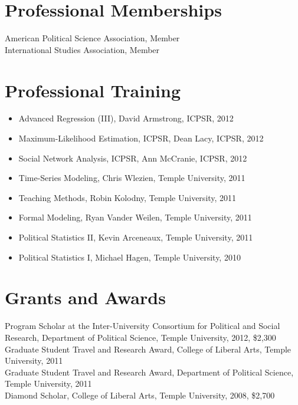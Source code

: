 \documentclass[margin, 12pt]{res} %
\begin{document}
\begin{resume}
\section{Professional Memberships} 

American Political Science Association, Member \vspace{3 mm} \\
International Studies Association, Member
 
\section{Professional Training}
\begin{itemize}
\item Advanced Regression (III), David Armstrong, ICPSR, 2012
\item Maximum-Likelihood Estimation, ICPSR, Dean Lacy, ICPSR, 2012
\item Social Network Analysis, ICPSR, Ann McCranie, ICPSR, 2012
\item Time-Series Modeling, Chris Wlezien, Temple University, 2011
\item Teaching Methods, Robin Kolodny, Temple University, 2011
\item Formal Modeling, Ryan Vander Weilen, Temple University, 2011
\item Political Statistics II, Kevin Arceneaux, Temple University, 2011
\item Political Statistics I, Michael Hagen, Temple University, 2010
\end{itemize}


\section{Grants and Awards} 

Program Scholar at the Inter-University Consortium for Political and Social Research, Department of Political Science, Temple University, 2012, \$2,300 \vspace{3 mm} \\
Graduate Student Travel and Research Award, College of Liberal Arts, Temple University, 2011 \vspace{3 mm} \\ 
Graduate Student Travel and Research Award, Department of Political Science, Temple University, 2011 \vspace{3 mm} \\
Diamond Scholar, College of Liberal Arts, Temple University, 2008, \$2,700 \\


\end{resume}
\end{document}
